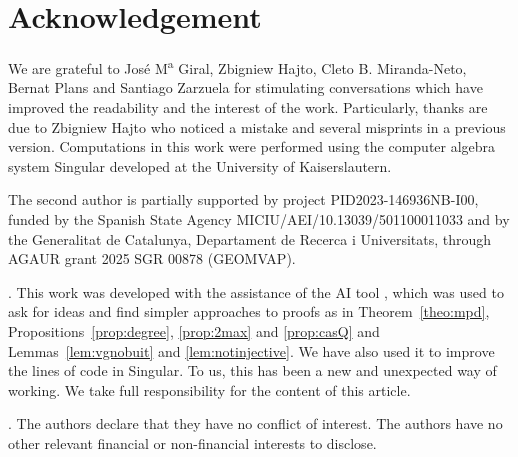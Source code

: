 \documentclass[11pt,reqno]{amsart}
\theoremstyle{definition}
\begin{document}
\section*{Acknowledgement}

We are grateful to Jos\'e 
M\textsuperscript{a} Giral, Zbigniew Hajto, Cleto B. Miranda-Neto, Bernat Plans
and Santiago Zarzuela for stimulating conversations which have improved
the readability and the interest of the work. 
Particularly, thanks are due to Zbigniew Hajto who noticed a mistake and several misprints
in a previous version. Computations in this work were performed using the computer algebra system {\sc Singular} \cite{dgps} developed at the University of Kaiserslautern.

The second author is partially supported by project PID2023-146936NB-I00, funded by the Spanish State Agency MICIU/AEI/10.13039/501100011033 and by the Generalitat de Catalunya, Departament de Recerca i Universitats, through AGAUR grant 2025 SGR 00878 (GEOMVAP).

\vspace*{0.2cm}

.
This work was developed with the assistance of the AI tool \cite{gemini}, which was used to ask for ideas and find simpler approaches to proofs as in Theorem~\ref{theo:mpd}, Propositions~\ref{prop:degree}, \ref{prop:2max} and \ref{prop:casQ} and Lemmas~\ref{lem:vgnobuit} and \ref{lem:notinjective}. We have also used it to improve the lines of code in Singular. To us, this has been a new and unexpected way of working. We take full responsibility for the content of this article.

\vspace*{0.2cm}

. The authors declare that they have no conflict of interest. The authors have no other relevant financial or non-financial interests to disclose.

\vspace*{-0.2cm}
\end{document}
